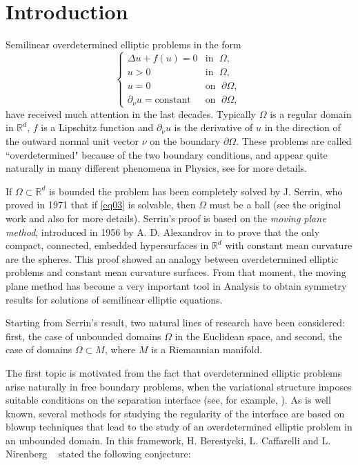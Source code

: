 \documentclass[reqno]{amsart}
\def\R{\mathbb R}
\numberwithin{equation}{section}
\newenvironment{key words}{\textbf{Keywords}\mbox{  }}{ }
\begin{document}
\section{Introduction}
\label{Section 1}
Semilinear overdetermined elliptic problems in the form
%
\begin{equation}\label{eq03}
\left\{\begin{array} {ll}
\Delta u + f(u) = 0 & \mbox{in }\; \Omega,\\
 u> 0 & \mbox{in }\; \Omega,\\
               u= 0 & \mbox{on }\; \partial \Omega, \\
 \partial_{\nu} u=\mbox{constant} &\mbox{on }\; \partial
\Omega,\,
\end{array}\right.
\end{equation}
%
have received much attention in the last decades. Typically $\Omega$ is a regular domain in $\R^d$, $f$ is a Lipschitz function and $\partial_{\nu} u$ is the derivative of $u$ in the direction of the outward normal unit vector $\nu$ on the boundary $\partial \Omega$. These problems are called ``overdetermined" because of the two boundary conditions, and appear quite naturally in many different phenomena in Physics, see \cite{S02,S56} for more details.

\medskip

If $\Omega \subset \R^d $ is bounded the problem has been completely solved by J. Serrin, who proved in 1971 that if \eqref{eq03} is solvable, then $\Omega$ must be a ball (see the original work \cite{S71} and also \cite{PS07} for more details). Serrin's proof is based on the {\it moving plane method}, introduced in 1956 by A. D. Alexandrov in \cite{A56} to prove that the only compact, connected, embedded hypersurfaces in $\R^d$ with constant mean curvature are the spheres. This proof showed an analogy between overdetermined elliptic problems and constant mean curvature surfaces. From that moment, the moving plane method has become a very important tool in Analysis to obtain symmetry results for solutions of semilinear elliptic equations.

\medskip

Starting from Serrin's result, two natural lines of research have been considered: first, the case of unbounded domains $\Omega$ in the Euclidean space, and second, the case of domains $\Omega \subset M$, where $M$ is a Riemannian manifold.

\medskip

The first topic is motivated from the fact that overdetermined elliptic problems arise naturally in free boundary problems, when the variational structure imposes suitable conditions on the separation interface (see, for example, \cite{AC81}). As is well known, several methods for studying the regularity of the interface are based on blowup techniques that lead to the study of an overdetermined elliptic problem in an unbounded domain. In this framework, H. Berestycki, L. Caffarelli and L. Nirenberg ~\cite{BCN97} stated the following conjecture:
\medskip
\end{document}
